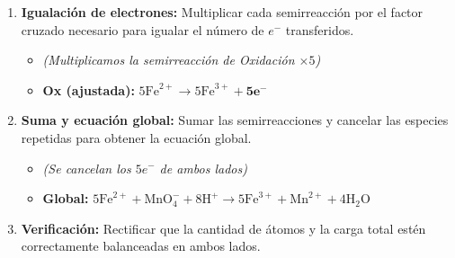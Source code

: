 \documentclass[letterpaper, 12pt, twoside]{article}
\newenvironment{formulabox}[1]{%
    \begin{tcolorbox}[colback=rojoSuave, colframe=rojoFuerte,
        title=\textbf{#1}, fonttitle=\bfseries]
}{%
    \end{tcolorbox}
}
\begin{document}
\begin{formulabox}{Pasos — Medio Ácido}
\begin{enumerate}[leftmargin=15pt, itemsep=0.3em]
\begin{itemize}[leftmargin=15pt, topsep=2pt, itemsep=0pt]
        \item \textbf{Red:} $\text{MnO}_4^- + 8\text{H}^+ + \mathbf{5e^-} \rightarrow \text{Mn}^{2+} + 4\text{H}_2\text{O}$
    \end{itemize}
    \vspace{0.2cm}
    \item \textbf{Igualación de electrones:} Multiplicar cada semirreacción por el factor cruzado necesario para igualar el número de $e^-$ transferidos.
    \begin{itemize}[leftmargin=15pt, topsep=2pt, itemsep=0pt]
        \item \textit{(Multiplicamos la semirreacción de Oxidación $\times 5$)}
        \item \textbf{Ox (ajustada):} $5\text{Fe}^{2+} \rightarrow 5\text{Fe}^{3+} + \mathbf{5e^-}$
    \end{itemize}
    \vspace{0.2cm}
    \item \textbf{Suma y ecuación global:} Sumar las semirreacciones y cancelar las especies repetidas para obtener la ecuación global.
    \begin{itemize}[leftmargin=15pt, topsep=2pt, itemsep=0pt]
        \item \textit{(Se cancelan los $5e^-$ de ambos lados)}
        \item \textbf{Global:} $5\text{Fe}^{2+} + \text{MnO}_4^- + 8\text{H}^+ \rightarrow 5\text{Fe}^{3+} + \text{Mn}^{2+} + 4\text{H}_2\text{O}$
    \end{itemize}
    \vspace{0.2cm}
    \item \textbf{Verificación:} Rectificar que la cantidad de átomos y la carga total estén correctamente balanceadas en ambos lados.
\end{enumerate}
\end{formulabox}
\end{document}

